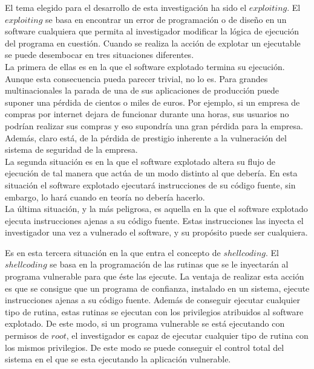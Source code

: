 \documentclass [titlepage, 12pt]{article}
\begin{document}
El tema elegido para el desarrollo de esta investigaci\'on ha sido el $exploiting$. El $exploiting$ se basa en encontrar un error de programaci\'on o de dise\~no en un software cualquiera que permita al investigador modificar la l\'ogica de ejecuci\'on del programa en cuesti\'on. Cuando se realiza la acci\'on de explotar un ejecutable se puede desembocar en tres situaciones diferentes. \\
La primera de ellas es en la que el software explotado termina su ejecuci\'on. Aunque esta consecuencia pueda parecer trivial, no lo es. Para grandes multinacionales la parada de una de sus aplicaciones de producci\'on puede suponer una p\'erdida de cientos o miles de euros. Por ejemplo, si un empresa de compras por internet dejara de funcionar durante una horas, sus usuarios no podr\'ian realizar sus compras y eso supondr\'ia una gran p\'erdida para la empresa. Adem\'as, claro est\'a, de la p\'erdida de prestigio inherente a la vulneraci\'on del sistema de seguridad de la empresa.\\
La segunda situaci\'on es en la que el software explotado altera su flujo de ejecuci\'on de tal manera que act\'ua de un modo distinto al que deber\'ia. En esta situaci\'on el software explotado ejecutar\'a instrucciones de su c\'odigo fuente, sin embargo, lo har\'a cuando en teor\'ia no deber\'ia hacerlo.\\
La \'ultima situaci\'on, y la m\'as peligrosa, es aquella en la que el software explotado ejecuta instrucciones ajenas a su c\'odigo fuente. Estas instrucciones las inyecta el investigador una vez a vulnerado el software, y su prop\'osito puede ser cualquiera. \bigskip

Es en esta tercera situaci\'on en la que entra el concepto de $shellcoding$. El $shellcoding$ se basa en la programaci\'on de las rutinas que se le inyectar\'an al programa vulnerable para que \'este las ejecute. La ventaja de realizar esta acci\'on es que se consigue que un programa de confianza, instalado en un sistema, ejecute instrucciones ajenas a su c\'odigo fuente. Adem\'as de conseguir ejecutar cualquier tipo de rutina, estas rutinas se ejecutan con los privilegios atribuidos al software explotado. De este modo, si un programa vulnerable se est\'a ejecutando con permisos de $root$, el investigador es capaz de ejecutar cualquier tipo de rutina con los mismos privilegios. De este modo se puede conseguir el control total del sistema en el que se esta ejecutando la aplicaci\'on vulnerable. \bigskip
\end{document}
